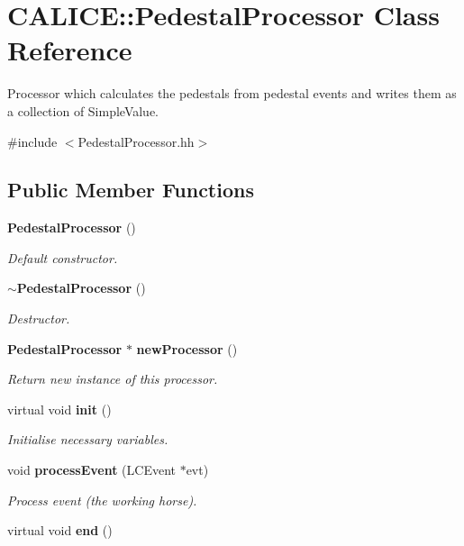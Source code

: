 \section{CALICE::PedestalProcessor Class Reference}
\label{classCALICE_1_1PedestalProcessor}


Processor which calculates the pedestals from pedestal events and writes them as a collection of SimpleValue.  


{\ttfamily \#include $<$PedestalProcessor.hh$>$}\subsection*{Public Member Functions}
\begin{DoxyCompactItemize}
\item 
{\bf PedestalProcessor} ()\label{classCALICE_1_1PedestalProcessor_a6bc9bd585510a41c6ca0f563ef93e60d}

\begin{DoxyCompactList}\small\item\em Default constructor. \item\end{DoxyCompactList}\item 
{\bf $\sim$PedestalProcessor} ()\label{classCALICE_1_1PedestalProcessor_a7afefac07d219138d0cbb0a172292584}

\begin{DoxyCompactList}\small\item\em Destructor. \item\end{DoxyCompactList}\item 
{\bf PedestalProcessor} $\ast$ {\bf newProcessor} ()\label{classCALICE_1_1PedestalProcessor_aaf59f11eb0d6cb2fd57e4093b2174edd}

\begin{DoxyCompactList}\small\item\em Return new instance of this processor. \item\end{DoxyCompactList}\item 
virtual void {\bf init} ()\label{classCALICE_1_1PedestalProcessor_a936b946a56f3e0c6203f413161d0b534}

\begin{DoxyCompactList}\small\item\em Initialise necessary variables. \item\end{DoxyCompactList}\item 
void {\bf processEvent} (LCEvent $\ast$evt)
\begin{DoxyCompactList}\small\item\em Process event (the working horse). \item\end{DoxyCompactList}\item 
virtual void {\bf end} ()\label{classCALICE_1_1PedestalProcessor_ace047025eb794a92d3abbfd089eb6b2c}


\end{DoxyCompactItemize}
